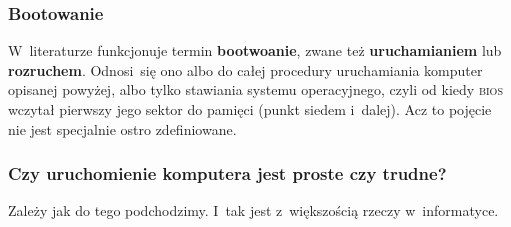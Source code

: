 \documentclass[10pt,t]{beamer}
\begin{document}
\begin{frame}
  \frametitle{Bootowanie}


  W~literaturze funkcjonuje termin \textbf{bootwoanie}, zwane też
  \textbf{uruchamianiem} lub \textbf{rozruchem}. Odnosi~się ono albo do
  całej procedury uruchamiania komputer opisanej powyżej, albo tylko
  stawiania systemu operacyjnego, czyli od kiedy \textsc{bios} wczytał
  pierwszy jego sektor do pamięci (punkt siedem i~dalej). Acz to pojęcie
  nie jest specjalnie ostro zdefiniowane.

\end{frame}





\begin{frame}
  \frametitle{Czy uruchomienie komputera jest proste czy trudne?}


  Zależy jak do tego podchodzimy. I~tak jest z~większością rzeczy
  w~informatyce.

\end{frame}










\appendix











\printbibliography










\end{document}
